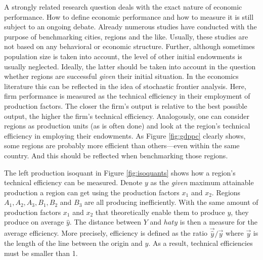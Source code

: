 \documentclass[11pt,parskip,abstracton,notitlepage]{scrartcl}
\begin{document}
A strongly related research question deals with the exact nature of economic performance. How to define economic performance and how to measure it is still subject to an ongoing debate. Already numerous studies have conducted with the purpose of benchmarking cities, regions and the like. Usually, these studies are not based on any behavioral or economic structure. Further, although sometimes population size is taken into account, the level of other initial endowments is usually neglected. Ideally, the latter should be taken into account in the question whether regions are successful \emph{given} their initial situation. In the economics literature this can be reflected in the idea of stochastic frontier analysis. Here, firm performance is measured as the technical efficiency in their employment of production factors. The closer the firm's output is relative to the best possible output, the higher the firm's technical efficiency. Analogously, one can consider regions as production units (as is often done) and look at the region's technical efficiency in employing their endowments. As Figure \ref{fig:gdppc} clearly shows, some regions are probably more efficient than others---even within the same country. And this should be reflected when benchmarking those regions. 

The left production isoquant in Figure \ref{fig:isoquants} shows how a region's technical efficiency can be measured. Denote $y$ as the \emph{given} maximum attainable production a region can get using the production factors $x_1$ and $x_2$. Regions $A_1, A_2, A_3, B_1, B_2$ and $B_3$ are all producing inefficiently. With the same amount of production factors $x_1$ and $x_2$ that theoretically enable them to produce $y$, they produce on average $\hat{y}$. The distance between $Y$ and $hat{y}$ is then a measure for the average efficiency. More precisely, efficiency is defined as the ratio $\vec{\hat{y}}/\vec{y}$ where  $\vec{y}$ is the length of the line between the origin and $y$. As a result, technical efficiencies must be smaller than 1. 
\end{document}
